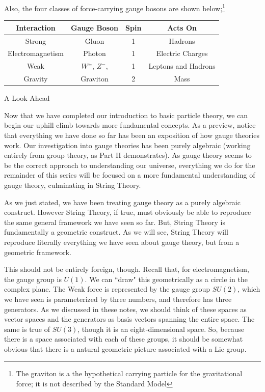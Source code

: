 \documentclass[12pt,epsf]{article}
\makeatletter
\def\section{\@startsection{section}{1}{\z@}{3.5ex plus 1ex minus .2ex}
 {2.3ex plus .2ex}{\large\bf}}
\makeatother
\begin{document}
Also, the four classes of force-carrying gauge bosons are shown
below;\footnote{The graviton is a the hypothetical carrying particle for
the gravitational force; it is not described by the Standard Model}
\newline
\begin{table} [h]
\centering
\begin{tabular}{|c|c|c|c|}
\hline
\bf Interaction & \bf Gauge Boson & \bf Spin & \bf Acts On \rm \\
\hline
\hline
Strong & Gluon & 1 & Hadrons \\
\hline
Electromagnetism & Photon & 1 & Electric Charges \\
\hline
Weak & $W^{\pm}$, $Z^-$, & 1 & Leptons and Hadrons \\
\hline
Gravity & Graviton & 2 & Mass \\
\hline
\end{tabular} \label{secondtab}
\end{table}
\newline


\section{A Look Ahead}

Now that we have completed our introduction to basic particle theory,
we can begin our uphill climb towards more fundamental concepts.  As a
preview, notice that everything we have done so far has been an
exposition of how gauge theories work. Our investigation into gauge
theories has been purely algebraic (working entirely from group theory,
as Part II demonstrates).  As gauge theory seems to be the correct
approach to understanding our universe, everything we do for the
remainder of this series  will be focused on a more fundamental
understanding of gauge theory, culminating in String Theory. 

As we just stated, we have been treating gauge theory as a purely
algebraic construct.  However String Theory, if true, must obviously be
able to reproduce the same general framework we have seen so far.  But,
String Theory is fundamentally a geometric construct.  As we will see,
String Theory will reproduce literally everything we have seen about
gauge theory, but from a geometric framework. 

This should not be entirely foreign, though.  Recall that, for
electromagnetism, the gauge group is $U(1)$.  We can ``draw" this
geometrically as a circle in the complex plane.  The Weak force is
represented by the gauge group $SU(2)$, which we have seen is
parameterized by three numbers, and therefore has three generators.  As we
discussed in these notes, we should think of these spaces as vector
spaces and the generators as basis vectors spanning the entire space. 
The same is true of $SU(3)$, though it is an eight-dimensional space. 
So, because there is a space associated with each of these groups, it
should be somewhat obvious that there is a natural geometric picture
associated with a Lie group. 
\end{document}
